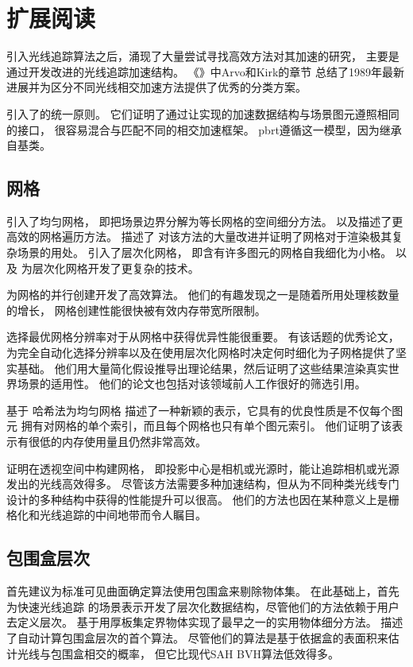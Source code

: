 \section{扩展阅读}\label{sec:扩展阅读04}
引入光线追踪算法之后，涌现了大量尝试寻找高效方法对其加速的研究，
主要是通过开发改进的光线追踪加速结构。
《》\citep{10.5555/94788}中Arvo和Kirk的章节
总结了1989年最新进展并为区分不同光线相交加速方法提供了优秀的分类方案。

\citet{Kirk88theray}引入了的统一原则。
它们证明了通过让实现的加速数据结构与场景图元遵照相同的接口，
很容易混合与匹配不同的相交加速框架。
pbrt遵循这一模型，因为继承自基类。

\subsection{网格}\label{sub:网格}
\citet{4056861}引入了均匀网格，
即把场景边界分解为等长网格的空间细分方法。
\citet{10.2312:egtp.19871000}
以及\citet{Cleary1988}描述了更高效的网格遍历方法。
\citet{10.1145/37401.37417}描述了
对该方法的大量改进并证明了网格对于渲染极其复杂场景的用处。
\citet{Jevans1989:23}引入了层次化网格，
即含有许多图元的网格自我细化为小格。
\citet{cazals1995filtering}以及
\citet{576857}为层次化网格开发了更复杂的技术。

\citet{4061545}为网格的并行创建开发了高效算法。
他们的有趣发现之一是随着所用处理核数量的增长，
网格创建性能很快被有效内存带宽所限制。

选择最优网格分辨率对于从网格中获得优异性能很重要。
\citet{4342587}有该话题的优秀论文，
为完全自动化选择分辨率以及在使用层次化网格时决定何时细化为子网格提供了坚实基础。
他们用大量简化假设推导出理论结果，然后证明了这些结果渲染真实世界场景的适用性。
他们的论文也包括对该领域前人工作很好的筛选引用。

\citet{lagae2008compact}基于
哈希法为均匀网格
描述了一种新颖的表示，它具有的优良性质是不仅每个图元
拥有对网格的单个索引，而且每个网格也只有单个图元索引。
他们证明了该表示有很低的内存使用量且仍然非常高效。

\citet{4634613}证明在透视空间中构建网格，
即投影中心是相机或光源时，能让追踪相机或光源发出的光线高效得多。
尽管该方法需要多种加速结构，但从为不同种类光线专门设计的多种结构中获得的性能提升可以很高。
他们的方法也因在某种意义上是栅格化和光线追踪的中间地带而令人瞩目。

\subsection{包围盒层次}\label{sub:包围盒层次}
\citet{10.1145/360349.360354}首先建议为标准可见曲面确定算法使用包围盒来剔除物体集。
在此基础上，\citet{10.1145/800250.807479}首先为快速光线追踪
的场景表示开发了层次化数据结构，尽管他们的方法依赖于用户去定义层次。
\citet{10.1145/15922.15916}基于用厚板集定界物体实现了最早之一的实用物体细分方法。
\citet{4057175}描述了自动计算包围盒层次的首个算法。
尽管他们的算法是基于依据盒的表面积来估计光线与包围盒相交的概率，
但它比现代SAH BVH算法低效得多。

